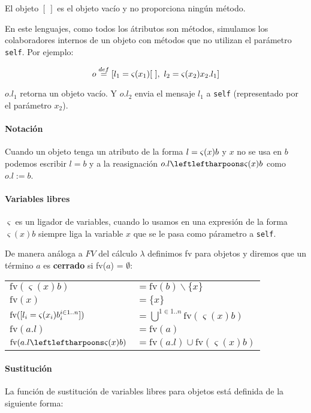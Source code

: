 \vspace*{5mm}
El objeto $[~]$ es el objeto vacío y no proporciona ningún método.

En este lenguajes, como todos los átributos son métodos, simulamos los colaboradores internos de un objeto con métodos que no utilizan el parámetro \texttt{self}. Por ejemplo:

$$o \overset{def}{=} [l_1 = \varsigma(x_1)[~],~
				l_2 = \varsigma(x_2)x_2.l_1]$$

$o.l_1$ retorna un objeto vacío. Y $o.l_2$ envia el mensaje $l_1$ a \texttt{self} (representado por el parámetro $x_2$). 

\paragraph{Notación} Cuando un objeto tenga un atributo de la forma $l = \varsigma(x)b$ y $x$ no se usa en $b$ podemos escribir $l = b$ y a la reasignación $\OORedefinicion{o.l}{x}{b}$ como $o.l := b$.

\paragraph{Variables libres}
$\varsigma$ es un ligador de variables, cuando lo usamos en una expresión de la forma $\varsigma(x)b$ siempre liga la variable $x$ que se le pasa como párametro a \texttt{self}.

De manera análoga a $FV$ del cálculo $\lambda$ definimos fv para objetos y diremos que un término $a$ es \textbf{cerrado} si fv($a$) = $\emptyset$:

\begin{center}
\begin{tabular}{ll}
	$\text{fv}(\varsigma(x)b)$ &$= \text{fv}(b)\backslash \{x\} $\\
	$\text{fv}(x)$ &$= \{x\} $\\
	$\text{fv}([l_i = \varsigma(x_i)b_i^{i\in 1..n}])$ &$=  \bigcup^{1\in 1..n} \text{fv}(\varsigma(x)b)$\\
	$\text{fv}(a.l)$ &$= \text{fv}(a) $\\
	$\text{fv}(\OORedefinicion{a.l}{x}{b})$ &$= \text{fv}(a.l)\cup \text{fv}(\varsigma(x)b) $\\
\end{tabular}
\end{center}
\paragraph{Sustitución} La función de sustitución de variables libres para objetos está definida de la siguiente forma:

